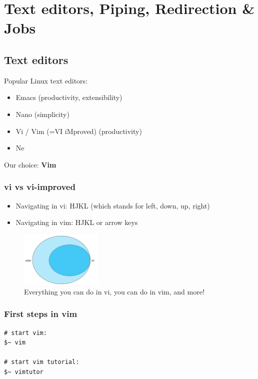 \documentclass{article}
\begin{document}
\section{Text editors, Piping, Redirection \& Jobs}

\subsection{Text editors}

Popular Linux text editors:

\begin{itemize}
    \item Emacs (productivity, extensibility)
    \item Nano (simplicity)
    \item Vi / Vim (=VI iMproved) (productivity)
    \item Ne
\end{itemize}

Our choice: \textbf{Vim}

\subsubsection{vi vs vi-improved}

\begin{itemize}
    \item Navigating in vi: HJKL (which stands for left, down, up, right)
    \item Navigating in vim: HJKL or arrow keys
\end{itemize}

\begin{figure}[H]
    \centering
    \includegraphics[width=0.35\textwidth]{vi-vim.png}
    \caption{Everything you can do in vi, you can do in vim, and more!}
\end{figure}

\subsubsection{First steps in vim}

\begin{verbatim}
# start vim:
$~ vim

# start vim tutorial:
$~ vimtutor
\end{verbatim}
\end{document}

